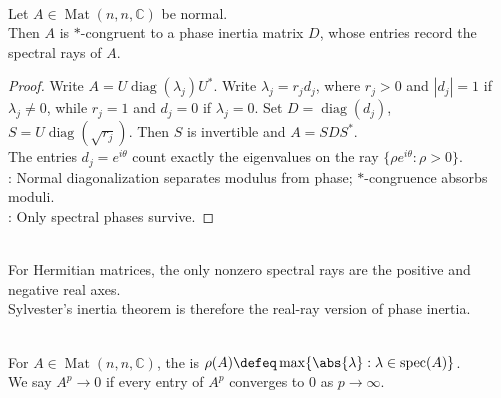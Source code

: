 \begin{proposition} \label{prop:normal-matrix-phase-inertia-form} \\
Let $A\in\operatorname{Mat}(n,n,\mathbb{C})$ be normal.\\
Then $A$ is $*$-congruent to a phase inertia matrix $D$, whose entries record the spectral rays of $A$.
\begin{proof}
Write $A=U\operatorname{diag}(\lambda_j)U^*$. Write $\lambda_j=r_jd_j$, where $r_j>0$ and $|d_j|=1$ if $\lambda_j\neq0$, while $r_j=1$ and $d_j=0$ if $\lambda_j=0$. Set $D=\operatorname{diag}(d_j)$, $S=U\operatorname{diag}(\sqrt{r_j})$. Then $S$ is invertible and $A=SDS^*$.\\
The entries $d_j=e^{i\theta}$ count exactly the eigenvalues on the ray $\{\rho e^{i\theta}:\rho>0\}$.\\
: Normal diagonalization separates modulus from phase; $*$-congruence absorbs moduli.\\
: Only spectral phases survive.
\end{proof}
\end{proposition}

\begin{perspective} \label{per:hermitian-inertia-as-real-phase-inertia} \\
For Hermitian matrices, the only nonzero spectral rays are the positive and negative real axes.\\
Sylvester's inertia theorem is therefore the real-ray version of phase inertia.
\end{perspective}

\begin{definition} \label{def:spectral-radius-and-convergent-matrix} \\
For $A\in\operatorname{Mat}(n,n,\mathbb{C})$, the  is $\rho(A)\defeq\max\{\abs{\lambda}:\lambda\in\operatorname{spec}(A)\}$.\\
We say $A^p\to0$ if every entry of $A^p$ converges to $0$ as $p\to\infty$.
\end{definition}

